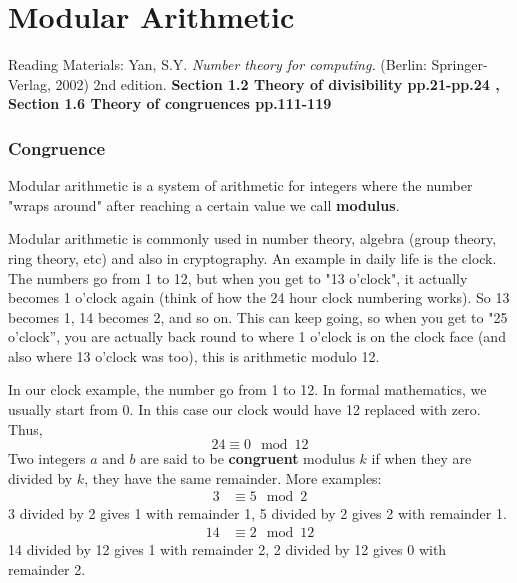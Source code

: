 \chapter{Modular Arithmetic}
Reading Materials: \newline
Yan, S.Y. \textit{Number theory for computing.} (Berlin: Springer-Verlag, 2002) 2nd edition. \textbf{Section 1.2 Theory of divisibility pp.21-pp.24 , Section 1.6 Theory of congruences pp.111-119}
\subsection{Congruence}
\noindent Modular arithmetic is a system of arithmetic for integers where the number "wraps around" after reaching a certain value we call \textbf{modulus}.

\vspace{5mm}

\noindent Modular arithmetic is commonly used in number theory, algebra (group theory, ring theory, etc) and also in cryptography. An example in daily life is the clock. The numbers go from 1 to 12, but when you get to "13 o'clock", it actually becomes 1 o'clock again (think of how the 24 hour clock numbering works). So 13 becomes 1, 14 becomes 2, and so on. This can keep going, so when you get to "25 o'clock'', you are actually back round to where 1 o'clock is on the clock face (and also where 13 o'clock was too), this is arithmetic modulo 12.

\vspace{5mm}

\noindent In our clock example, the number go from 1 to 12. In formal mathematics, we usually start from 0. In this case our clock would have 12 replaced with zero. Thus,
\begin{equation}
24\equiv 0 \mod{12}
\end{equation}
\noindent Two integers $a$ and $b$ are said to be \textbf{congruent} modulus $k$ if when they are divided by $k$, they have the same remainder.
\vspace{5mm}
\noindent More examples:
\begin{equation}
\begin{split}
3 &\equiv 5 \mod{2} 
\end{split}
\end{equation}
3 divided by 2 gives 1 with remainder 1, 5 divided by 2 gives 2 with remainder 1.
\begin{equation}
\begin{split}
14 &\equiv 2 \mod{12} 
\end{split}
\end{equation}
14 divided by 12 gives 1 with remainder 2, 2 divided by 12 gives 0 with remainder 2.
\vspace{5mm}

